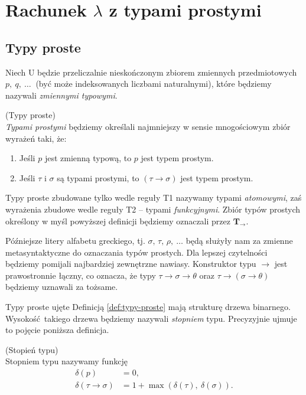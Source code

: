 \section{Rachunek \(\lambda\) z typami prostymi}


\subsection{Typy proste}\label{ssec:typy-proste}
Niech \(\mathrm{U}\) będzie przeliczalnie nieskończonym zbiorem zmiennych przedmiotowych \(p,\ q,\ \dots\ \) (być może indeksowanych liczbami naturalnymi), które będziemy nazywali \emph{zmiennymi typowymi}.\begin{definicja}\label{def:typy-proste}(Typy proste)\\
\emph{Typami prostymi} będziemy określali najmniejszy w sensie mnogościowym zbiór wyrażeń taki, że:
\begin{enumerate}[label=T\arabic*.]
  \item Jeśli \(p\) jest zmienną typową, to \(p\) jest typem prostym.
  \item Jeśli \(\tau\) i \(\sigma\) są typami prostymi, to \(\left(\tau\to\sigma\right)\) jest typem prostym.
\end{enumerate}
\end{definicja}

Typy proste zbudowane tylko wedle reguły T1 nazywamy typami \emph{atomowymi}, zaś wyrażenia zbudowe wedle reguły T2 -- typami \emph{funkcyjnymi}. Zbiór typów prostych określony w myśl powyższej definicji będziemy oznaczali przez \(\mathbf{T_\to}\).

Późniejsze litery alfabetu greckiego, tj. \(\sigma,\, \tau,\, \rho,\ \dots\) będą służyły nam za zmienne metasyntaktyczne do oznaczania typów prostych. Dla lepszej czytelności będziemy pomijali najbardziej zewnętrzne nawiasy. Konstruktor typu \(\to\) jest prawostronnie łączny, co oznacza, że typy \(\tau\to\sigma\to\theta\) oraz \(\tau\to(\sigma\to\theta)\) będziemy uznawali za tożsame.

Typy proste ujęte Definicją \ref{def:typy-proste} mają strukturę drzewa binarnego. Wysokość takiego drzewa będziemy nazywali \emph{stopniem} typu. Precyzyjnie ujmuje to pojęcie poniższa definicja.
\begin{definicja}\label{def:stopien-typu}(Stopień typu)\\
  Stopniem typu nazywamy funkcję 
  \begin{align*}
    \delta(p) &= 0,\\
    \delta(\tau\to\sigma)&=1 + \max\left(\delta(\tau),\ \delta(\sigma)\right).
  \end{align*}
\end{definicja}

